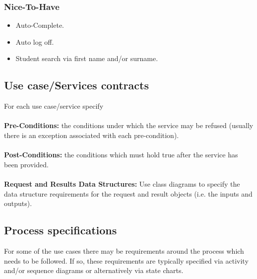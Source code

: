 \documentclass[11pt,a4paper]{article}
\begin{document}
\subsubsection{Nice-To-Have} 
\begin{itemize}
\item Auto-Complete.
\item Auto log off.
\item Student search via first name and/or surname.
\end{itemize}

\subsection{Use case/Services contracts}
For each use case/service specify
\\\\
\textbf{Pre-Conditions: }the conditions under which the service may be refused (usually there is an exception associated with each pre-condition).
\\\\
\textbf{Post-Conditions: }the conditions which must hold true after the service has been provided.
\\\\
\textbf{Request and Results Data Structures: }Use class diagrams to specify the data structure requirements for the request and result objects (i.e. the inputs and outputs).
\subsection{Process specifications}
For some of the use cases there may be requirements around the process which needs to be followed. If so, these requirements are typically specified via activity and/or sequence diagrams or
alternatively via state charts.
\end{document}
